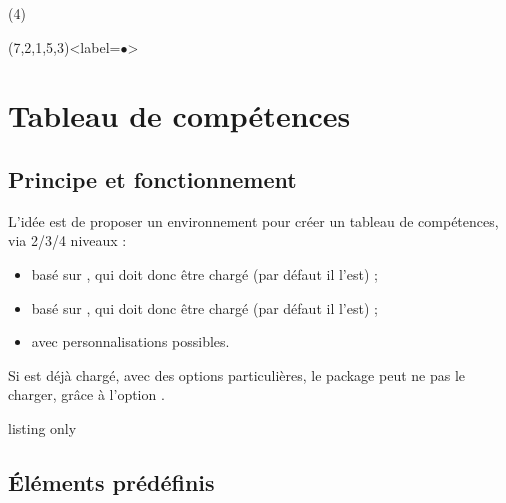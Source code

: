 \documentclass[french,11pt,a4paper]{article}
\begin{document}

\begin{DemoCode}{}
(4)
\end{DemoCode}

\begin{DemoCode}{}
(7,2,1,5,3)<label=$\bullet$>
\end{DemoCode}

\pagebreak

\section{Tableau de compétences}

\subsection{Principe et fonctionnement}

L'idée est de proposer un environnement pour créer un tableau de compétences, via 2/3/4 niveaux :

\begin{itemize}
	\item basé sur , qui doit donc être chargé (par défaut il l'est) ;
	\item basé sur , qui doit donc être chargé (par défaut il l'est) ;
	\item avec personnalisations possibles.
\end{itemize}

Si  est déjà chargé, avec des options particulières, le package peut ne pas le charger, grâce à l'option .

\begin{DemoCode}{listing only}
\end{DemoCode}

\begin{DemoCode}{}
\end{DemoCode}

\subsection{Éléments prédéfinis}
\end{document}
